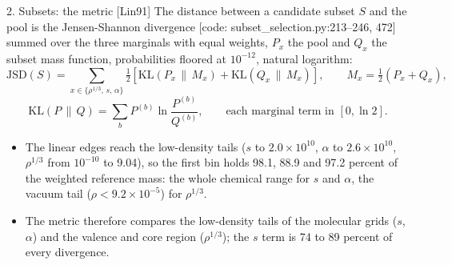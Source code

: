\begin{frame}{2. Subsets: the metric [Lin91]}
  \small
  The distance between a candidate subset $S$ and the pool is the Jensen-Shannon divergence [code: subset\_selection.py:213--246, 472] summed over the three marginals with equal weights, $P_x$ the pool and $Q_x$ the subset mass function, probabilities floored at $10^{-12}$, natural logarithm:
  \[
  \mathrm{JSD}(S) = \sum_{x \in \{\rho^{1/3},\, s,\, \alpha\}} \tfrac12 \left[ \mathrm{KL}(P_x \,\|\, M_x) + \mathrm{KL}(Q_x \,\|\, M_x) \right], \qquad
  M_x = \tfrac12 (P_x + Q_x),
  \]
  \[
  \mathrm{KL}(P \,\|\, Q) = \sum_b P^{(b)} \ln \frac{P^{(b)}}{Q^{(b)}}, \qquad \text{each marginal term in } [0, \ln 2].
  \]
  \begin{itemize}
    \item The linear edges reach the low-density tails ($s$ to $2.0\times10^{10}$, $\alpha$ to $2.6\times10^{10}$, $\rho^{1/3}$ from $10^{-10}$ to 9.04), so the first bin holds 98.1, 88.9 and 97.2 percent of the weighted reference mass: the whole chemical range for $s$ and $\alpha$, the vacuum tail ($\rho < 9.2\times10^{-5}$) for $\rho^{1/3}$.
    \item The metric therefore compares the low-density tails of the molecular grids ($s$, $\alpha$) and the valence and core region ($\rho^{1/3}$); the $s$ term is 74 to 89 percent of every divergence.
  \end{itemize}
\end{frame}
